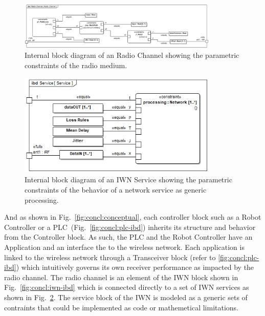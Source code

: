 \begin{figure}[!th]
	\centering
	\includegraphics[width=0.85\textwidth]{chapter-conclusions/images/RadioChannel}
	\caption{Internal block diagram of an Radio Channel showing the parametric constraints of the radio medium.}
	\label{fig:concl:RadioChannel-ibd}
\end{figure}

\begin{figure}[!th]
	\centering
	\includegraphics[width=0.85\textwidth]{chapter-conclusions/images/Service}
	\caption{Internal block diagram of an IWN Service showing the parametric constraints of the behavior of a network service as generic processing.}
	\label{fig:concl:Service-ibd}
\end{figure}

And as shown in Fig.~\ref{fig:concl:conceptual}, each controller block such as a Robot Controller or a PLC~(Fig.~\ref{fig:concl:plc-ibd}) inherits its structure and behavior from the Controller block.  As such, the PLC and the Robot Controller have an Application and an interface the to the wireless network.  Each application is linked to the wireless network through a Transceiver block (refer to \ref{fig:concl:plc-ibd}) which intuitively governs its own receiver performance as impacted by the radio channel.  The radio channel is an element of the IWN block shown in Fig.~\ref{fig:concl:iwn-ibd} which is connected directly to a set of IWN services as shown in Fig.~\ref{fig:concl:Service-ibd}. The service block of the IWN is modeled as a generic sets of contraints that could be implemented as code or mathemetical limitations.  

